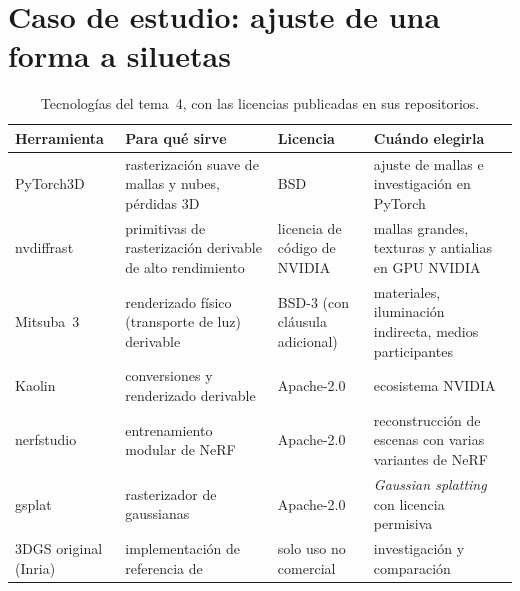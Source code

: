 \section{Caso de estudio: ajuste de una forma a siluetas}

\addtocounter{definicion}{1}%

\begin{table}[h]
\centering\small
\begin{tabularx}{\textwidth}{@{}l>{\raggedright\arraybackslash}X>{\raggedright\arraybackslash}p{2.9cm}>{\raggedright\arraybackslash}X@{}}
\toprule
Herramienta & Para qué sirve & Licencia & Cuándo elegirla \\
\midrule
PyTorch3D & rasterización suave de mallas y nubes, pérdidas 3D & BSD & ajuste de mallas e investigación en PyTorch \\
nvdiffrast & primitivas de rasterización derivable de alto rendimiento & licencia de código de NVIDIA & mallas grandes, texturas y antialias en GPU NVIDIA \\
Mitsuba~3 & renderizado físico (transporte de luz) derivable & BSD-3 (con cláusula adicional) & materiales, iluminación indirecta, medios participantes \\
Kaolin & conversiones y renderizado derivable & Apache-2.0 & ecosistema NVIDIA \\
nerfstudio & entrenamiento modular de NeRF & Apache-2.0 & reconstrucción de escenas con varias variantes de NeRF \\
gsplat & rasterizador de gaussianas & Apache-2.0 & \emph{Gaussian splatting} con licencia permisiva \\
3DGS original (Inria) & implementación de referencia de~\cite{gs} & solo uso no comercial & investigación y comparación \\
\bottomrule
\end{tabularx}
\caption{Tecnologías del tema~4, con las licencias publicadas en sus repositorios.}
\label{tab:tec4}
\end{table}

\addtocounter{definicion}{1}%

